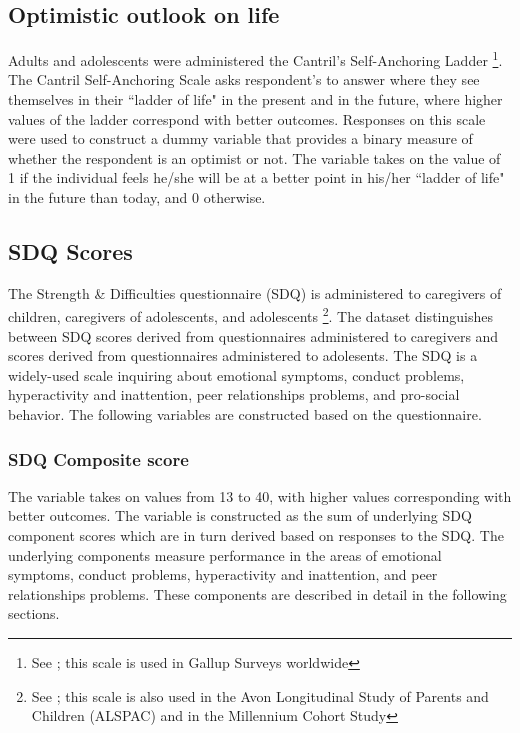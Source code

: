 \subsection{Optimistic outlook on life}
Adults and adolescents were administered the Cantril's Self-Anchoring Ladder \footnote{See \cite{Cantril_1965_BOOK_Pattern-Hum-Con}; this scale is used in Gallup Surveys worldwide}. The Cantril Self-Anchoring Scale asks respondent's to answer where they see themselves in their ``ladder of life" in the present and in the future, where higher values of the ladder correspond with better outcomes. Responses on this scale were used to construct a dummy variable that provides a binary measure of whether the respondent is an optimist or not. The variable takes on the value of 1 if the individual feels he/she will be at a better point in his/her ``ladder of life" in the future than today, and 0 otherwise.

\subsection{SDQ Scores}
The  Strength \& Difficulties questionnaire (SDQ) is administered to caregivers of children, caregivers of adolescents, and adolescents \footnote{See \cite{Goodman_1997_JCPP}; this scale is also used in the Avon Longitudinal
Study of Parents and Children (ALSPAC) and in the Millennium Cohort Study}. The dataset distinguishes between SDQ scores derived from questionnaires administered to caregivers and scores derived from questionnaires administered to adolesents. The SDQ is a widely-used scale inquiring about emotional symptoms, conduct problems, hyperactivity and inattention, peer relationships problems, and pro-social behavior. The following variables are constructed based on the questionnaire.

\subsubsection{SDQ Composite score}
The variable takes on values from 13 to 40, with higher values corresponding with better outcomes. The variable is constructed as the sum of underlying SDQ component scores which are in turn derived based on responses to the SDQ. The underlying components measure performance in the areas of emotional symptoms, conduct problems, hyperactivity and inattention, and peer relationships problems. These components are described in detail in the following sections.

